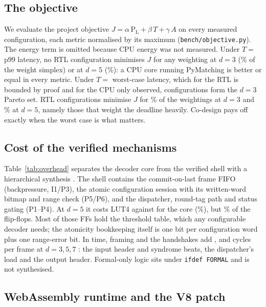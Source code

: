 \subsection{The objective}
We evaluate the project objective $J=\alpha\,\mathrm{P_L}+\beta\,T+\gamma\,A$ on every measured configuration,
each metric normalised by its maximum (\texttt{bench/objective.py}). The energy term is omitted because CPU energy
was not measured. Under $T=$ p99 latency, no RTL configuration minimises $J$ for any weighting at $d=3$
(\% of the weight simplex) or at $d=5$ (\%): a CPU core running
PyMatching is better or equal in every metric. Under $T=$ worst-case latency, which for the RTL is bounded by proof
and for the CPU only observed,  configurations form the $d=3$ Pareto set. RTL
configurations minimise $J$ for \% of the weightings at $d=3$ and
\% at $d=5$, namely those that weight the deadline heavily. Co-design pays off exactly
when the worst case is what matters.

\subsection{Cost of the verified mechanisms}
Table~\ref{tab:overhead} separates the decoder core from the verified shell with a hierarchical synthesis
. The shell contains the commit-on-last frame FIFO (backpressure, I1/P3), the atomic configuration
session with its written-word bitmap and range check (P5/P6), and the dispatcher, round-tag path and status gating
(P1--P4). At $d=5$ it costs  LUT4 against  for the core
(\%), but \% of the flip-flops. Most of those FFs hold the
threshold table, which any configurable decoder needs; the atomicity bookkeeping itself is one bit per configuration
word plus one range-error bit. In time, framing and the handshakes add ,
 and  cycles per frame at $d=3,5,7$ : the input
header and syndrome beats, the dispatcher's load and the output header. Formal-only logic sits under
\texttt{ifdef FORMAL} and is not synthesised.


\subsection{WebAssembly runtime and the V8 patch}\label{sec:eval-wasm}
